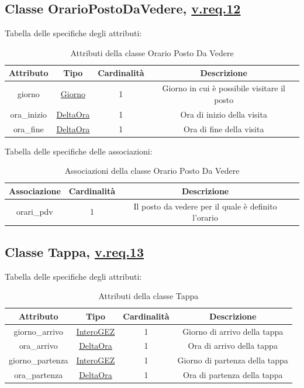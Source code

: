 \documentclass{article}
\begin{document}
\subsection*{Classe OrarioPostoDaVedere, \hyperref[sec:RequisitiOrarioPostoDaVedere]{v.req.12}}\label{sec:OrarioPostoDaVedere}
Tabella delle specifiche degli attributi:
\begin{table}[h!]
    \centering
    \begin{tabular}{|c|c|c|c|}
        \hline
        Attributo & Tipo & Cardinalità & Descrizione \\
        \hline
        giorno & \hyperref[sec:Giorno]{Giorno} & 1 & Giorno in cui è possibile visitare il posto \\
        ora\_inizio & \hyperref[sec:DeltaOra]{DeltaOra} & 1 & Ora di inizio della visita \\
        ora\_fine & \hyperref[sec:DeltaOra]{DeltaOra} & 1 & Ora di fine della visita \\
        \hline
    \end{tabular}
    \caption{Attributi della classe Orario Posto Da Vedere}
\end{table}

Tabella delle specifiche delle associazioni:
\begin{table}[h!]
    \centering
    \begin{tabular}{|c|c|c|c|}
        \hline
        Associazione & Cardinalità & Descrizione \\
        \hline
        orari\_pdv & 1 & Il posto da vedere per il quale è definito l'orario \\
        \hline
    \end{tabular}
    \caption{Associazioni della classe Orario Posto Da Vedere}
\end{table}

\subsection*{Classe Tappa, \hyperref[sec:RequisitiTappa]{v.req.13}}\label{sec:Tappa}

Tabella delle specifiche degli attributi:
\begin{table}[h!]
    \centering
    \begin{tabular}{|c|c|c|c|}
        \hline
        Attributo & Tipo & Cardinalità & Descrizione \\
        \hline
        giorno\_arrivo & \hyperref[sec:InteroGEZ]{InteroGEZ} & 1 & Giorno di arrivo della tappa \\
        ora\_arrivo & \hyperref[sec:DeltaOra]{DeltaOra} & 1 & Ora di arrivo della tappa \\
        giorno\_partenza & \hyperref[sec:InteroGEZ]{InteroGEZ} & 1 & Giorno di partenza della tappa \\
        ora\_partenza & \hyperref[sec:DeltaOra]{DeltaOra} & 1 & Ora di partenza della tappa \\
        \hline
    \end{tabular}
    \caption{Attributi della classe Tappa}
\end{table}
\end{document}
